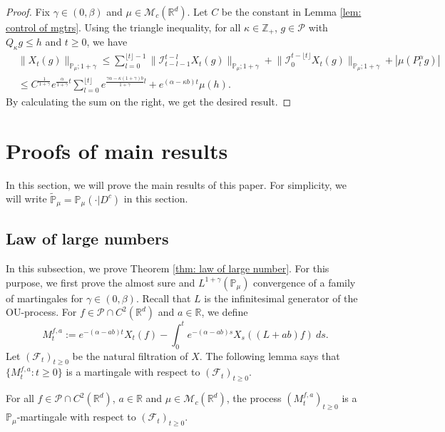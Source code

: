 \documentclass[EJP]{ejpecp} %
\begin{document}
\begin{proof}
	Fix $\gamma \in (0,\beta)$ and $\mu \in \mathcal M_c(\mathbb R^d)$.
	Let $C$ be the constant in Lemma \ref{lem: control of mgtrs}.
	Using the triangle inequality, for all $\kappa\in \mathbb Z_+$, $g \in \mathcal P$ with $Q_\kappa g \leq h$ and $t\geq 0$, we have
\begin{align}
	& \|X_t(g)\|_{\mathbb P_\mu;1+\gamma}
	\leq \sum_{l=0}^{\lfloor t\rfloor - 1}\big\| \mathcal{I}_{t-l-1}^{t-l}X_t(g) \big\|_{\mathbb P_\mu;1+\gamma}+\big\| \mathcal{I}_{0}^{t-\lfloor t \rfloor}X_t(g)  \big\|_{\mathbb P_\mu;1+\gamma} + |\mu(P^\alpha_t g)| \\
	& \leq C^{\frac{1}{1+\gamma}} e^{\frac{\alpha}{1+\gamma}t} \sum_{l=0}^{\lfloor t\rfloor} e^{\frac{\gamma\alpha-\kappa (1+\gamma)b}{1+\gamma} l} + e^{(\alpha - \kappa b)t} \mu(h).
\end{align}
	By calculating the sum on the right, we get the desired result.
\end{proof}

\section{Proofs of main results}
\label{proofs of main results}
	In this section, we will prove the main results of this paper.
	For simplicity, we will write $\mathbb{\widetilde{P}}_{\mu}=\mathbb{P}_{\mu}(\cdot|D^c)$ in this section.

\subsection{Law of large numbers}
\label{sec: large rate lln}
	In this subsection, we prove Theorem \ref{thm: law of large number}.
	For this purpose, we first prove the almost sure and $L^{1+\gamma}(\mathbb{P}_{\mu})$ convergence of a family of martingales for $\gamma\in (0, \beta)$. Recall that $L$ is the infinitesimal generator of the OU-process.  For $f\in \mathcal{P}\cap C^2(\mathbb R^d)$ and  $a\in \mathbb R$, we define
\begin{equation}
\label{defmartingale}
  	M_t^{f,a}
   	:=e^{-(\alpha-ab)t}X_t(f)-\int_0^t e^{-(\alpha-ab)s} X_s((L+ab)f)~ ds.
\end{equation}
	Let $(\mathscr{F}_t)_{t\geq 0}$ be the natural filtration of $X$.  The following lemma says that $\{M_t^{f,a}: t\geq 0\}$ is a martingale with respect to $(\mathscr{F}_t)_{t\geq 0}$.

\begin{lemma}
\label{lemma25}
  	For all $f\in \mathcal{P}\cap C^2(\mathbb R^d)$, $a\in \mathbb R$ and $\mu\in \mathcal M_c(\mathbb R^d)$, the process $(M_t^{f,a})_{t\geq 0}$ is a $\mathbb P_\mu$-martingale with respect to $(\mathscr F_t)_{t\geq 0}$.
\end{lemma}
\end{document}

